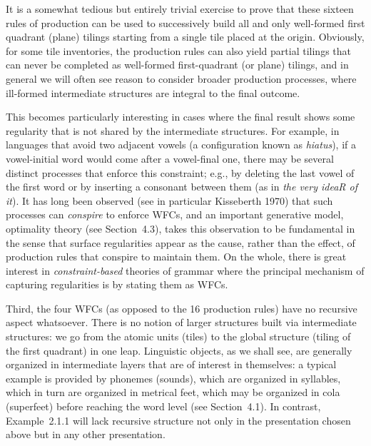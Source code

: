 It is a somewhat tedious but entirely trivial exercise to prove that these
sixteen rules of production can be used to successively build all and only
well-formed first quadrant (plane) tilings starting from a single tile placed
at the origin.  Obviously, for some tile inventories, the production rules can
also yield partial tilings that can never be completed as well-formed
first-quadrant (or plane) tilings, and in general we will often see reason to
consider broader production processes, where ill-formed intermediate
structures are integral to the final outcome.

This becomes particularly interesting in cases where the final result shows
some regularity that is not shared by the intermediate structures. For
example, in languages that avoid two adjacent vowels (a configuration known as
{\it hiatus}),  if a vowel-initial word would come after a
vowel-final one, there may be several distinct processes that enforce this
constraint; e.g., by deleting the last vowel of the first word or by inserting
a consonant between them (as in {\it the very ideaR of it}). It has long been
observed (see in particular Kisseberth 1970)\nocite{Kisseberth:1970} that such
processes can {\it conspire} to enforce WFCs, and an important generative
model, optimality theory (see Section~4.3), takes this observation to be
fundamental in the sense that surface regularities appear as the cause, rather
than the effect, of production rules that conspire to maintain them.  On the
whole, there is great interest in {\it constraint-based} theories of grammar
where the principal mechanism of capturing regularities is by stating them as
WFCs. 

Third, the four WFCs (as opposed to the 16 production rules) have no recursive
aspect whatsoever. There is no notion of larger structures built via
intermediate structures: we go from the atomic units (tiles) to the global
structure (tiling of the first quadrant) in one leap. Linguistic objects, as
we shall see, are generally organized in intermediate layers that are of
interest in themselves: a typical example is provided by phonemes (sounds),
which are organized in syllables, which in turn are organized in metrical
feet, which may be organized in cola (superfeet) before reaching the word
level (see Section~4.1). In contrast, Example~2.1.1 will lack recursive
structure not only in the presentation chosen above but in any other
presentation.

